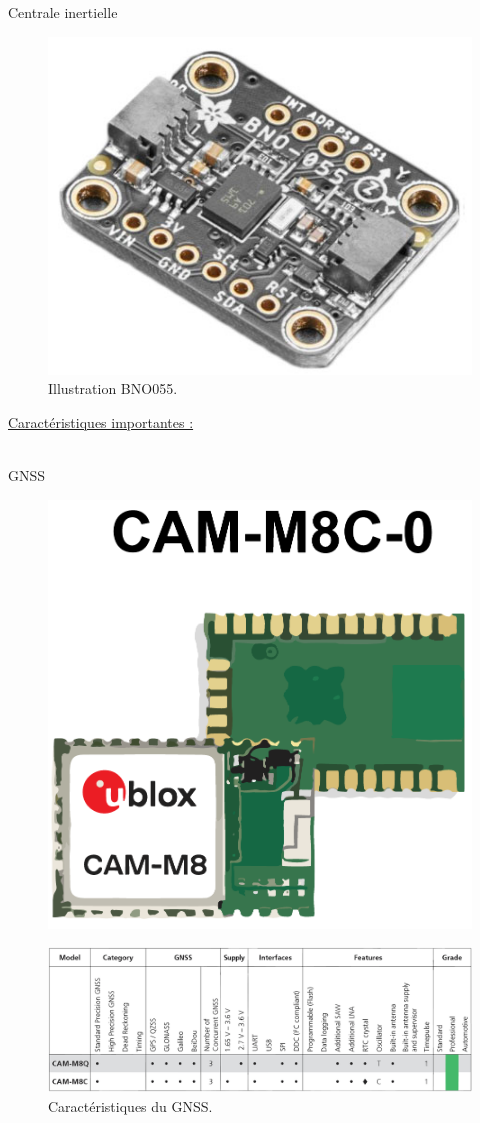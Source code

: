 \documentclass{beamer}
\begin{document}
\begin{frame}{Centrale inertielle}
	\begin{center}
		\begin{figure}[h]
			\centering
			\includegraphics[width=0.25\linewidth]{../figures/pre_etude/BNO055_Adafruit}
			\caption{Illustration BNO055.}
		\end{figure} \vspace*{-2mm}
		
		\underline{Caractéristiques importantes :} \\
		 \\
	\end{center}
\end{frame}

\begin{frame}{GNSS}
	\begin{figure}[h]
		\centering
		\includegraphics[width=0.25\linewidth]{../figures/pre_etude/img_gnss_crp}
	\end{figure}
	
	\begin{figure}[h]
		\centering
		\includegraphics[width=.9\linewidth]{../figures/pre_etude/carac_GNSS}
		\caption{Caractéristiques du GNSS.}
		\label{fig:caracgnss}
	\end{figure}
\end{frame}
\end{document}

